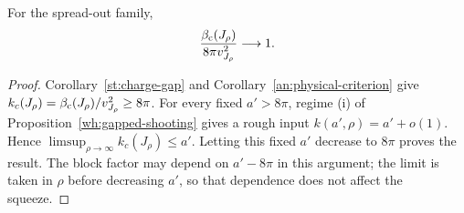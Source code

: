 \begin{corollary}\label{wh:spread-out}
For the spread-out family,
\[
 \frac{\beta_{\mathrm c}(J_\rho)}{8\pi v_{J_\rho}^2}\longrightarrow1.
\]
\end{corollary}

\begin{proof}
Corollary~\ref{st:charge-gap} and Corollary~\ref{an:physical-criterion} give
$k_c(J_\rho)=\beta_{\mathrm c}(J_\rho)/v_{J_\rho}^2\ge8\pi$.
For every fixed $a'>8\pi$, regime (i) of
Proposition~\ref{wh:gapped-shooting} gives a rough input
$k(a',\rho)=a'+o(1)$.  Hence
$\limsup_{\rho\to\infty}k_c(J_\rho)\le a'$.
Letting this fixed $a'$ decrease to $8\pi$ proves the result.
The block factor may depend on $a'-8\pi$ in this argument; the
limit is taken in $\rho$ before decreasing $a'$, so that dependence
does not affect the squeeze.
\end{proof}
